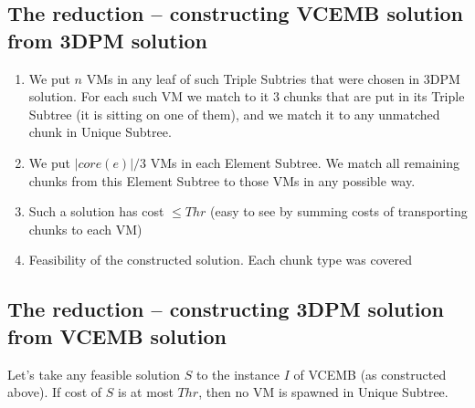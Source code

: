 \subsection{The reduction -- constructing VCEMB solution from 3DPM
  solution}

\begin{enumerate}
  \item We put $n$ VMs in any leaf of such Triple Subtries that were
  chosen in 3DPM solution. For each such VM we match to it 3 chunks
  that are put in its Triple Subtree (it is sitting on one of them),
  and we match it to any unmatched chunk in Unique Subtree.
  \item We put $|core(e)|/3$ VMs in each Element Subtree. We match all remaining
  chunks from this Element Subtree to those VMs in any possible
  way.
  \item Such a solution has cost $\leq Thr$ (easy to see by
  summing costs of transporting chunks to each VM)
  \item Feasibility of the constructed solution. Each chunk type was covered
\end{enumerate}

\subsection{The reduction -- constructing 3DPM solution from VCEMB
  solution}

\begin{theorem}
  Let's take any feasible solution $S$ to the instance $I$ of VCEMB
  (as constructed above). If cost of $S$ is at most $Thr$, then no VM
  is spawned in Unique Subtree.
  \label{th:no-unique}
\end{theorem}

